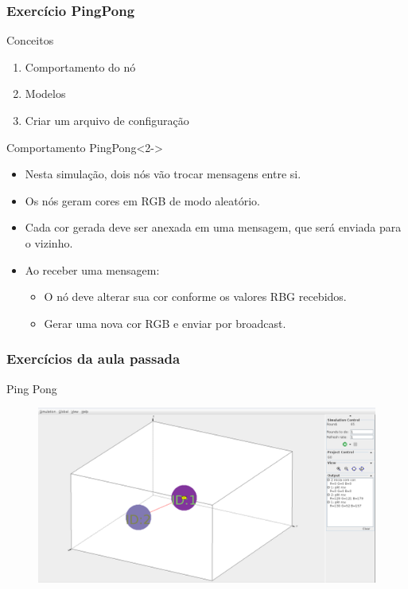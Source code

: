 \documentclass{beamer}
\begin{document}
\begin{frame}\frametitle{Exercício PingPong}
	
	\begin{block}{Conceitos}
		\begin{enumerate}
			\item Comportamento do nó
			\item Modelos
			\item Criar um arquivo de configuração
		\end{enumerate}
	\end{block}
	
	\begin{exampleblock}{Comportamento PingPong}<2->
	\begin{itemize}
		\item Nesta simulação, dois nós vão trocar mensagens entre si.
		\item Os nós geram cores em RGB de modo aleatório.
		\item Cada cor gerada deve ser anexada em uma mensagem, que será enviada para o vizinho.
		\item Ao receber uma mensagem:
		\begin{itemize}
			\item O nó deve alterar sua cor conforme os valores RBG recebidos.
			\item Gerar uma nova cor RGB e enviar por broadcast. 
		\end{itemize}		 
	\end{itemize}
	\end{exampleblock}	
	
\end{frame}

\begin{frame}\frametitle{Exercícios da aula passada}
		
	\begin{exampleblock}{Ping Pong}
		\begin{figure}[t]
			\includegraphics[width=1\linewidth]{img/pingpong.png}
		\end{figure}
	\end{exampleblock}
\end{frame}
\end{document}
